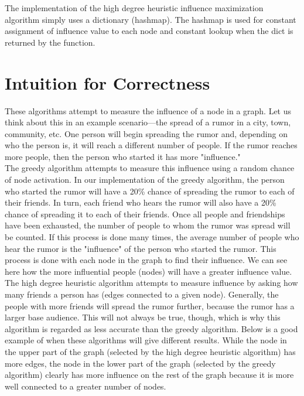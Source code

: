 \documentclass{article}
\begin{document}
The implementation of the high degree heuristic influence maximization algorithm simply uses a dictionary (hashmap).  The hashmap is used for constant assignment of influence value to each node and constant lookup when the dict is returned by the function.

\section{Intuition for Correctness}

These algorithms attempt to measure the influence of a node in a graph.  Let us think about this in an example scenario---the spread of a rumor in a city, town, community, etc.  One person will begin spreading the rumor and, depending on who the person is, it will reach a different number of people.  If the rumor reaches more people, then the person who started it has more "influence." \\

The greedy algorithm attempts to measure this influence using a random chance of node activation.  In our implementation of the greedy algorithm, the person who started the rumor will have a 20\% chance of spreading the rumor to each of their friends.  In turn, each friend who hears the rumor will also have a 20\% chance of spreading it to each of their friends.  Once all people and friendships have been exhausted, the number of people to whom the rumor was spread will be counted.  If this process is done many times, the average number of people who hear the rumor is the "influence" of the person who started the rumor.  This process is done with each node in the graph to find their influence.  We can see here how the more influential people (nodes) will have a greater influence value. \\

The high degree heuristic algorithm attempts to measure influence by asking how many friends a person has (edges connected to a given node).  Generally, the people with more friends will spread the rumor further, because the rumor has a larger base audience.  This will not always be true, though, which is why this algorithm is regarded as less accurate than the greedy algorithm.  Below is a good example of when these algorithms will give different results.  While the node in the upper part of the graph (selected by the high degree heuristic algorithm) has more edges, the node in the lower part of the graph (selected by the greedy algorithm) clearly has more influence on the rest of the graph because it is more well connected to a greater number of nodes.
\end{document}
